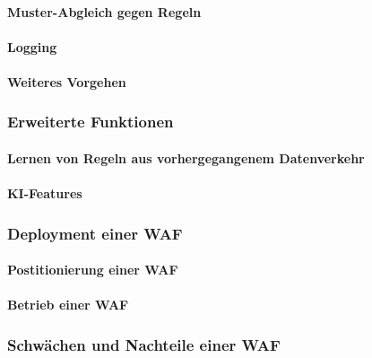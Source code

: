 \paragraph{Muster-Abgleich gegen Regeln}

\paragraph{Logging}

\paragraph{Weiteres Vorgehen}
% 

\subsubsection{Erweiterte Funktionen}
\paragraph{Lernen von Regeln aus vorhergegangenem Datenverkehr}
\paragraph{KI-Features}
\subsubsection{Deployment einer WAF}
\paragraph{Postitionierung einer WAF}
\paragraph{Betrieb einer WAF}
\subsubsection{Schwächen und Nachteile einer WAF}
